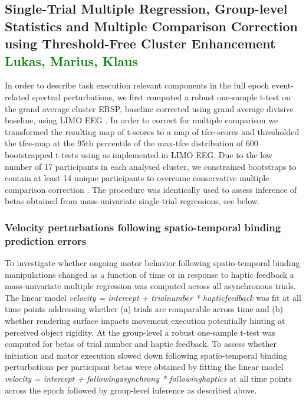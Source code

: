 \subsection{Single-Trial Multiple Regression, Group-level Statistics and Multiple Comparison Correction using Threshold-Free Cluster Enhancement \textcolor{green}{Lukas, Marius, Klaus}}
In order to describe task execution relevant components in the full epoch event-related spectral perturbations, we first computed a robust one-sample t-test on the grand average cluster ERSP, baseline corrected using grand average divisive baseline, using LIMO EEG \cite{Pernet2011}. In order to correct for multiple comparison we transformed the resulting map of t-scores to a map of tfce-scores and thresholded the tfce-map at the 95th percentile of the max-tfce distribution of 600 bootstrapped t-tests using as implemented in LIMO EEG. Due to the low number of 17 participants in each analysed cluster, we constrained bootstraps to contain at least 14 unique participants to overcome conservative multiple comparison correction \cite{Pernet2015}. The procedure was identically used to assess inference of betas obtained from mass-univariate single-trial regressions, see below.

\subsubsection{Velocity perturbations following spatio-temporal binding prediction errors}
To investigate whether ongoing motor behavior following spatio-temporal binding manipulations changed as a function of time or in response to haptic feedback a mass-univariate multiple regression was computed across all asynchronous trials. The linear model \textit{velocity = intercept + trial\textunderscore number * haptic\textunderscore feedback} was fit at all time points addressing whether (a) trials are comparable across time and (b) whether rendering surface impacts movement execution potentially hinting at perceived object rigidity. At the group-level a robust one-sample t-test was computed for betas of trial number and haptic feedback. To assess whether initiation and motor execution slowed down following spatio-temporal binding perturbations per participant betas were obtained by fitting the linear model \textit{velocity = intercept + following\textunderscore asynchrony * following\textunderscore haptics} at all time points across the epoch followed by group-level inference as described above.

